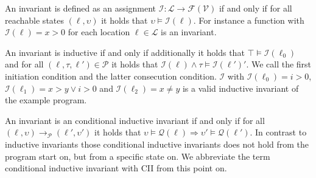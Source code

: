 An invariant is defined as an assignment $\mathcal{I} : \mathcal{L} \rightarrow \mathcal{F}(\mathcal{V})$ if and only if for all reachable states $(\ell, \upsilon)$ it holds that $\upsilon \models \mathcal{I}(\ell)$.
For instance a function with $\mathcal{I}(\ell) = x > 0$ for each location $\ell \in \mathcal{L}$ is an invariant.

An invariant is inductive if and only if additionally it holds that $\top \models \mathcal{I}(\ell_0)$ and for all $(\ell, \tau, \ell') \in \mathcal{P}$ it holds that $\mathcal{I}(\ell) \wedge \tau \models \mathcal{I}(\ell')'$. We call the first initiation condition and the latter consecution condition.
$\mathcal{I}$ with $\mathcal{I}(\ell_0) = i > 0$, $\mathcal{I}(\ell_1) = x > y \vee i > 0$ and $\mathcal{I}(\ell_2) = x \neq y$ is a valid inductive invariant of the example program.

An invariant is an conditional inductive invariant if and only if for all $(\ell, \upsilon) \rightarrow_\mathcal{P} (\ell', \upsilon')$ it holds that $\upsilon \models \mathcal{Q}(\ell) \Rightarrow \upsilon' \models \mathcal{Q}(\ell')$.
In contrast to inductive invariants those conditional inductive invariants does not hold from the program start on, but from a specific state on.
We abbreviate the term conditional inductive invariant with CII from this point on.
